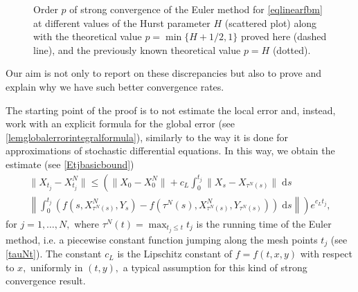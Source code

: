 \documentclass[reqno,12pt]{amsart}
\theoremstyle{plain} %
\theoremstyle{definition} %
\begin{document}
\begin{figure}[htb]
    \caption{Order $p$ of strong convergence of the Euler method for \cref{eqlinearfbm} at different values of the Hurst parameter $H$ (scattered plot) along with the theoretical value $p=\min\{H + 1/2, 1\}$ proved here (dashed line), and the previously known theoretical value $p=H$ (dotted).}
    \label{figorderdepHfBmintro}
\end{figure}

Our aim is not only to report on these discrepancies but also to prove and explain why we have such better convergence rates. 

The starting point of the proof is to not estimate the local error and, instead, work with an explicit formula for the global error (see \cref{lemglobalerrorintegralformula}), similarly to the way it is done for approximations of stochastic differential equations. In this way, we obtain the estimate (see \cref{Etjbasicbound})
\begin{multline}
    \label{Etjbasicboundintro}
        \|X_{t_j} - X_{t_j}^N\| \leq \left( \|X_0 - X_0^N\| + c_L \int_0^{t_j} \|X_s - X_{\tau^N(s)}\| \;\mathrm{d}s \right. \\
        \left. \left\|\int_0^{t_j} \left( f(s, X_{\tau^N(s)}^N, Y_s) - f(\tau^N(s), X_{\tau^N(s)}^N, Y_{\tau^N(s)}) \right)\;\mathrm{d}s\right\|\right) e^{c_L t_j},
\end{multline}
for $j = 1, \ldots, N,$ where $\tau^N(t) = \max_{t_j \leq t} t_j$ is the running time of the Euler method, i.e. a piecewise constant function jumping along the mesh points $t_j$ (see \cref{tauNt}). The constant $c_L$ is the Lipschitz constant of $f=f(t, x, y)$ with respect to $x,$ uniformly in $(t, y),$ a typical assumption for this kind of strong convergence result.
\end{document}
